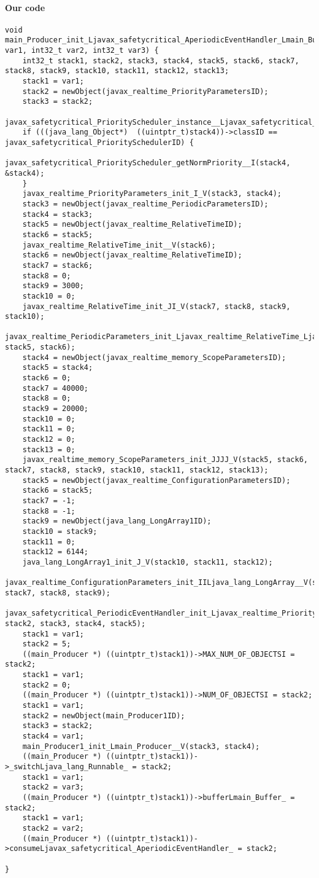\paragraph{Our code}\hfill
\begin{lstlisting}[firstnumber=224]
void main_Producer_init_Ljavax_safetycritical_AperiodicEventHandler_Lmain_Buffer__V(int32_t var1, int32_t var2, int32_t var3) {
	int32_t stack1, stack2, stack3, stack4, stack5, stack6, stack7, stack8, stack9, stack10, stack11, stack12, stack13;
	stack1 = var1;
	stack2 = newObject(javax_realtime_PriorityParametersID);
	stack3 = stack2;
	javax_safetycritical_PriorityScheduler_instance__Ljavax_safetycritical_PriorityScheduler_(&stack4);
	if (((java_lang_Object*)  ((uintptr_t)stack4))->classID == javax_safetycritical_PrioritySchedulerID) {
		javax_safetycritical_PriorityScheduler_getNormPriority__I(stack4, &stack4);
	}
	javax_realtime_PriorityParameters_init_I_V(stack3, stack4);
	stack3 = newObject(javax_realtime_PeriodicParametersID);
	stack4 = stack3;
	stack5 = newObject(javax_realtime_RelativeTimeID);
	stack6 = stack5;
	javax_realtime_RelativeTime_init__V(stack6);
	stack6 = newObject(javax_realtime_RelativeTimeID);
	stack7 = stack6;
	stack8 = 0;
	stack9 = 3000;
	stack10 = 0;
	javax_realtime_RelativeTime_init_JI_V(stack7, stack8, stack9, stack10);
	javax_realtime_PeriodicParameters_init_Ljavax_realtime_RelativeTime_Ljavax_realtime_RelativeTime__V(stack4, stack5, stack6);
	stack4 = newObject(javax_realtime_memory_ScopeParametersID);
	stack5 = stack4;
	stack6 = 0;
	stack7 = 40000;
	stack8 = 0;
	stack9 = 20000;
	stack10 = 0;
	stack11 = 0;
	stack12 = 0;
	stack13 = 0;
	javax_realtime_memory_ScopeParameters_init_JJJJ_V(stack5, stack6, stack7, stack8, stack9, stack10, stack11, stack12, stack13);
	stack5 = newObject(javax_realtime_ConfigurationParametersID);
	stack6 = stack5;
	stack7 = -1;
	stack8 = -1;
	stack9 = newObject(java_lang_LongArray1ID);
	stack10 = stack9;
	stack11 = 0;
	stack12 = 6144;
	java_lang_LongArray1_init_J_V(stack10, stack11, stack12);
	javax_realtime_ConfigurationParameters_init_IILjava_lang_LongArray__V(stack6, stack7, stack8, stack9);
	javax_safetycritical_PeriodicEventHandler_init_Ljavax_realtime_PriorityParameters_Ljavax_realtime_PeriodicParameters_Ljavax_realtime_memory_ScopeParameters_Ljavax_realtime_ConfigurationParameters__V(stack1, stack2, stack3, stack4, stack5);
	stack1 = var1;
	stack2 = 5;
	((main_Producer *) ((uintptr_t)stack1))->MAX_NUM_OF_OBJECTSI = stack2;
	stack1 = var1;
	stack2 = 0;
	((main_Producer *) ((uintptr_t)stack1))->NUM_OF_OBJECTSI = stack2;
	stack1 = var1;
	stack2 = newObject(main_Producer1ID);
	stack3 = stack2;
	stack4 = var1;
	main_Producer1_init_Lmain_Producer__V(stack3, stack4);
	((main_Producer *) ((uintptr_t)stack1))->_switchLjava_lang_Runnable_ = stack2;
	stack1 = var1;
	stack2 = var3;
	((main_Producer *) ((uintptr_t)stack1))->bufferLmain_Buffer_ = stack2;
	stack1 = var1;
	stack2 = var2;
	((main_Producer *) ((uintptr_t)stack1))->consumeLjavax_safetycritical_AperiodicEventHandler_ = stack2;

}
\end{lstlisting}

